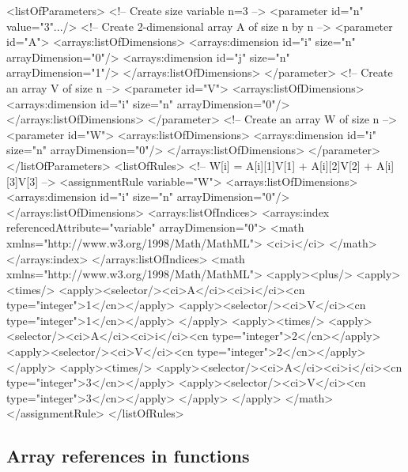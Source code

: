 \begin{example}
<listOfParameters> 
 <!-- Create size variable n=3 -->
 <parameter id="n" value="3".../>
 <!-- Create 2-dimensional array A of size n by n -->
 <parameter id="A">
  <arrays:listOfDimensions>
   <arrays:dimension id="i" size="n" arrayDimension="0"/> 
   <arrays:dimension id="j" size="n" arrayDimension="1"/>
  </arrays:listOfDimensions> 
 </parameter> 
 <!-- Create an array V of size n -->
 <parameter id="V">
  <arrays:listOfDimensions>
   <arrays:dimension id="i" size="n" arrayDimension="0"/>
  </arrays:listOfDimensions> 
 </parameter> 
 <!-- Create an array W of size n -->
 <parameter id="W">
  <arrays:listOfDimensions>
   <arrays:dimension id="i" size="n" arrayDimension="0"/>
  </arrays:listOfDimensions> 
 </parameter>
</listOfParameters>
<listOfRules>
 <!-- W[i] = A[i][1]V[1] + A[i][2]V[2] + A[i][3]V[3] -->
 <assignmentRule variable="W">
  <arrays:listOfDimensions>
   <arrays:dimension id="i" size="n" arrayDimension="0"/>
  </arrays:listOfDimensions> 
  <arrays:listOfIndices>
   <arrays:index referencedAttribute="variable" arrayDimension="0">
    <math xmlns="http://www.w3.org/1998/Math/MathML">
      <ci>i</ci>
    </math>
   </arrays:index>
  </arrays:listOfIndices>
  <math xmlns="http://www.w3.org/1998/Math/MathML">
   <apply><plus/>
    <apply><times/>
     <apply><selector/><ci>A</ci><ci>i</ci><cn type="integer">1</cn></apply>
     <apply><selector/><ci>V</ci><cn type="integer">1</cn></apply>
    </apply>
    <apply><times/>
     <apply><selector/><ci>A</ci><ci>i</ci><cn type="integer">2</cn></apply>
     <apply><selector/><ci>V</ci><cn type="integer">2</cn></apply>
    </apply>
    <apply><times/>
     <apply><selector/><ci>A</ci><ci>i</ci><cn type="integer">3</cn></apply>
     <apply><selector/><ci>V</ci><cn type="integer">3</cn></apply>
    </apply>
   </apply>
  </math>
 </assignmentRule>
</listOfRules>
\end{example}



\subsection{Array references in functions}

